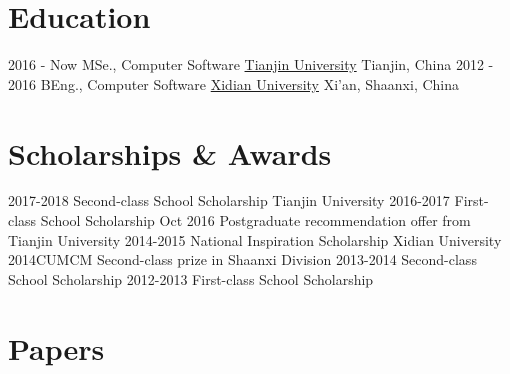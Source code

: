 \documentclass[letterpaper]{twentysecondcv} %
\begin{document}
\makeprofile %

\section{Education}

\begin{twenty} %
    \twentyitem
        {2016 - Now}
        {MSe., Computer Software}
        {\href{http://tju.edu.cn/}{Tianjin University}}
        {Tianjin, China}
        {}
    \twentyitem
        {2012 - 2016}
        {BEng., Computer Software}
        {\href{http://www.xidian.edu.cn/}{Xidian University}}
        {Xi'an, Shaanxi, China}
        {}
\end{twenty}



\section{Scholarships \& Awards}

\begin{twenty}
    \twentyitem
        {2017-2018}
        {Second-class School Scholarship}
        {Tianjin University}
        {}
        {}
    \twentyitem
        {2016-2017}
        {First-class School Scholarship}
        {}
        {}
        {}
    \twentyitem
        {Oct 2016}
        {Postgraduate recommendation offer from Tianjin University}
        {}
        {}
        {}
    \twentyitem
        {2014-2015}
        {National Inspiration Scholarship}
        {Xidian University}
        {}
        {}
    \twentyitem
        {2014CUMCM}
        {Second-class prize in Shaanxi Division}
        {}
        {}
        {}
    \twentyitem
        {2013-2014}  
        {Second-class School Scholarship}
        {}
        {}
        {}
    \twentyitem        
        {2012-2013}
        {First-class School Scholarship}
        {}
        {}
        {}        
\end{twenty}

\section{Papers}
\end{document}
